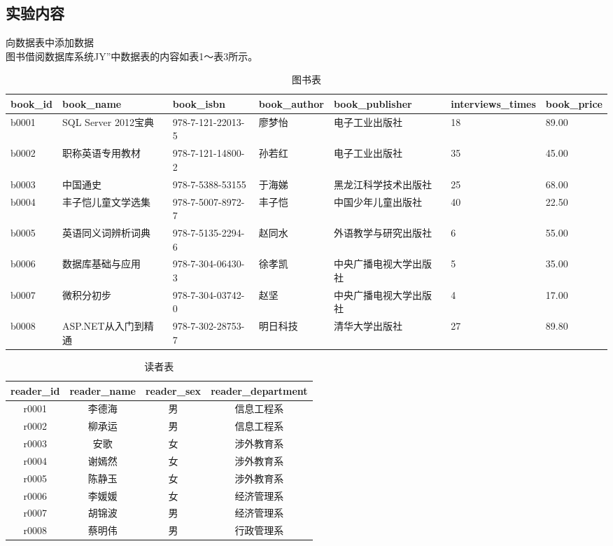 \documentclass[a4paper]{article}
\begin{document}
\subsection{实验内容}

向数据表中添加数据\\
图书借阅数据库系统JY”中数据表的内容如表1～表3所示。

\begin{table}[H]
\centering
\caption{图书表}
\label{tab:books}
\begin{tabular}{|p{1.2cm}|p{2.5cm}|p{2.5cm}|p{2.5cm}|p{2.5cm}|p{2.5cm}|p{2.5cm}|}
\hline
\textbf{book\_id} & \textbf{book\_name} & \textbf{book\_isbn} & \textbf{book\_author} & \textbf{book\_publisher} & \textbf{interviews\_times} & \textbf{book\_price} \\
\hline
b0001 & SQL Server 2012宝典 & 978-7-121-22013-5 & 廖梦怡 & 电子工业出版社 & 18 & 89.00 \\
\hline
b0002 & 职称英语专用教材 & 978-7-121-14800-2 & 孙若红 & 电子工业出版社 & 35 & 45.00 \\
\hline
b0003 & 中国通史 & 978-7-5388-53155 & 于海娣 & 黑龙江科学技术出版社 & 25 & 68.00 \\
\hline
b0004 & 丰子恺儿童文学选集 & 978-7-5007-8972-7 & 丰子恺 & 中国少年儿童出版社 & 40 & 22.50 \\
\hline
b0005 & 英语同义词辨析词典 & 978-7-5135-2294-6 & 赵同水 & 外语教学与研究出版社 & 6 & 55.00 \\
\hline
b0006 & 数据库基础与应用 & 978-7-304-06430-3 & 徐孝凯 & 中央广播电视大学出版社 & 5 & 35.00 \\
\hline
b0007 & 微积分初步 & 978-7-304-03742-0 & 赵坚 & 中央广播电视大学出版社 & 4 & 17.00 \\
\hline
b0008 & ASP.NET从入门到精通 & 978-7-302-28753-7 & 明日科技 & 清华大学出版社 & 27 & 89.80 \\
\hline
\end{tabular}
\end{table}
\begin{table}[H]
\centering
\caption{读者表}
\label{tab:readers}
\begin{tabular}{|c|c|c|c|}
\hline
\textbf{reader\_id} & \textbf{reader\_name} & \textbf{reader\_sex} & \textbf{reader\_department} \\
\hline
r0001 & 李德海 & 男 & 信息工程系 \\
\hline
r0002 & 柳承运 & 男 & 信息工程系 \\
\hline
r0003 & 安歌 & 女 & 涉外教育系 \\
\hline
r0004 & 谢嫣然 & 女 & 涉外教育系 \\
\hline
r0005 & 陈静玉 & 女 & 涉外教育系 \\
\hline
r0006 & 李媛媛 & 女 & 经济管理系 \\
\hline
r0007 & 胡锦波 & 男 & 经济管理系 \\
\hline
r0008 & 蔡明伟 & 男 & 行政管理系 \\
\hline
\end{tabular}
\end{table}
\end{document}
